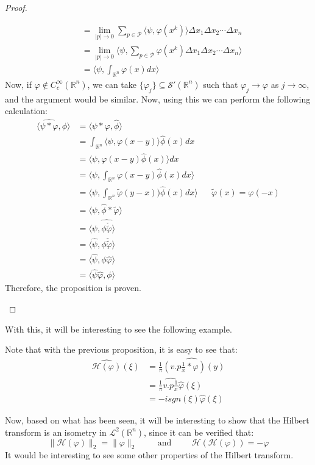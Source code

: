 \begin{proof}{}
\begin{itemize}
\begin{align*}
        &=\lim_{|p|\rightarrow 0}\sum_{p\in\mathcal{P}}\langle \psi,\varphi(x^k) \rangle \Delta x_1\Delta x_2\cdots\Delta x_n\\
        &=\lim_{|p|\rightarrow 0}\langle \psi,\sum_{p\in\mathcal{P}}\varphi(x^k)\Delta x_1\Delta x_2\cdots\Delta x_n \rangle \\
        &=\langle \psi, \int_{\mathbb{R}^n}\varphi(x)dx \rangle
      \end{align*}
      Now, if $\varphi\notin C^{\infty}_{c}(\mathbb{R}^n)$, we can take $\{\varphi_j\}\subseteq \mathcal{S}'(\mathbb{R}^n)$ such that $\varphi_j\rightarrow \varphi$ as $j\rightarrow \infty$, and the argument would be similar.
      Now, using this we can perform the following calculation:
      \begin{align*}
        \langle \hat{\psi*\varphi},\phi \rangle&=\langle \psi*\varphi,\hat{\phi} \rangle\\
        &=\int_{\mathbb{R}^n}\langle \psi,\varphi(x-y) \rangle\hat{\phi}(x)dx\\
        &=\langle \psi, \varphi(x-y)\hat{\phi}(x) \rangle dx\\
        &=\langle \psi, \int_{\mathbb{R}^n}\varphi(x-y)\hat{\phi}(x)dx \rangle\\
        &=\langle \psi, \int_{\mathbb{R}^n}\tilde{\varphi}(y-x))\hat{\phi}(x)dx \rangle &&\tilde{\varphi}(x)=\varphi(-x)\\
        &=\langle \psi, \hat{\phi}*\tilde{\varphi} \rangle\\
        &=\langle \psi, \hat{\phi\check{\tilde{\varphi}}} \rangle\\
        &=\langle \hat{\psi}, \phi\check{\tilde{\varphi}} \rangle\\
        &=\langle \hat{\psi}, \phi\hat{\varphi} \rangle\\
        &=\langle \hat{\psi}\hat{\varphi},\phi \rangle                
      \end{align*}
      Therefore, the proposition is proven.
  \end{itemize}
\end{proof}
With this, it will be interesting to see the following example.
\begin{example}{}
  Note that with the previous proposition, it is easy to see that:
  \begin{align*}
    \hat{\mathcal{H}(\varphi)}(\xi)&=\hat{\frac{1}{\pi}(v.p\frac{1}{x}*\varphi)(y)}\\
    &=\frac{1}{\pi}\hat{v.p\frac{1}{x}}\hat{\varphi}(\xi)\\
    &=-i sgn(\xi) \hat{\varphi}(\xi)
  \end{align*}
\end{example}
Now, based on what has been seen, it will be interesting to show that the Hilbert transform is an isometry in $\mathcal{L}^2(\mathbb{R}^n)$, since it can be verified that:
$$\|\mathcal{H}(\varphi)\|_2=\|\varphi\|_2 \hspace{1cm}\text{and}\hspace{1cm}\mathcal{H}(\mathcal{H}(\varphi))=-\varphi$$
It would be interesting to see some other properties of the Hilbert transform.
